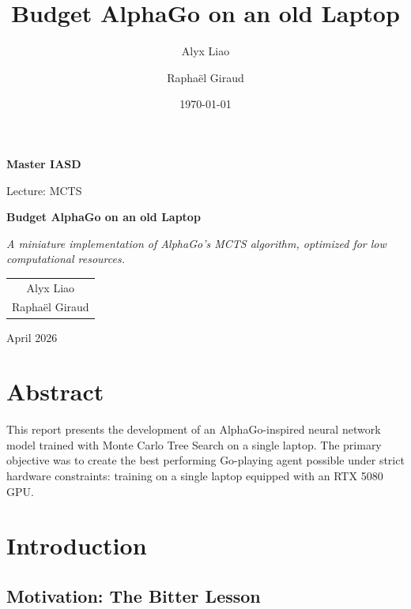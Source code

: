 \documentclass[12pt]{article}
\title{\textbf{Budget AlphaGo on an old Laptop}}
\author{Alyx Liao \and Raphaël Giraud}
\date{\today}
\begin{document}
\begin{titlepage}
    \centering
    \vspace*{2cm}
    
    {\Large \textbf{Master IASD}}
    
    \vspace{1cm}
    
    {\large Lecture: MCTS}
    
    \vspace{3cm}
    
    {\Huge \textbf{Budget AlphaGo on an old Laptop}}
    
    \vspace{2cm}
    
    {\Large \textit{A miniature implementation of AlphaGo's MCTS algorithm, optimized for low computational resources.}}
    
    \vspace{3cm}
    
    {\large
        \begin{tabular}{c}
            Alyx Liao \\
            Raphaël Giraud
        \end{tabular}
    }
    
    \vspace{2cm}
    
    {\large April 2026}
    
    \vfill
\end{titlepage}

\newpage
\section*{Abstract}

This report presents the development of an AlphaGo-inspired neural network model trained with Monte Carlo Tree Search on a single laptop. The primary objective was to create the best performing Go-playing agent possible under strict hardware constraints: training on a single laptop equipped with an RTX 5080 GPU.
\newpage

\tableofcontents
\newpage

\section{Introduction}

\subsection{Motivation: The Bitter Lesson}
\end{document}
